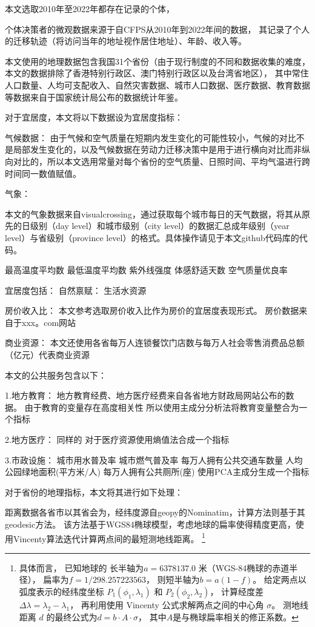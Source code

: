 \documentclass[
  a4paper,
  zihao=-4,
  fontset=mac,
  AutoFakeBold,
  AutoFakeSlant,
  oneside]{ctexbook}
\let\oldfootnote\footnote
\renewcommand{\footnote}[1]{%
  \oldfootnote{\setstretch{1.5}#1}%
}
\begin{document}
本文选取2010年至2022年都存在记录的个体，

个体决策者的微观数据来源于自CFPS从2010年到2022年间的数据，
其记录了个人的迁移轨迹（将访问当年的地址视作居住地址）、年龄、收入等。


本文使用的地理数据包含我国31个省份（由于现行制度的不同和数据收集的难度，本文的数据排除了香港特别行政区、澳门特别行政区以及台湾省地区），
其中常住人口数量、人均可支配收入、自然灾害数据、城市人口数据、医疗数据、教育数据等数据来自于国家统计局公布的数据统计年鉴。


对于宜居度，本文将以下数据设为宜居度指标：

气候数据：
由于气候和空气质量在短期内发生变化的可能性较小，气候的对比不是局部发生变化的，以及气候数据在劳动力迁移决策中是用于进行横向对比而非纵向对比的，所以本文选用常量对每个省份的空气质量、日照时间、平均气温进行跨时间同一数值赋值。

气象：

本文的气象数据来自visualcrossing，通过获取每个城市每日的天气数据，将其从原先的日级别（day level）和城市级别（city level）的数据汇总成年级别（year level）与省级别（province level）的格式。具体操作请见于本文github代码库的代码。

最高温度平均数 最低温度平均数 紫外线强度 体感舒适天数  空气质量优良率


宜居度包括：
自然禀赋：
生活水资源


房价收入比：
本文参考\textcite{LiHuiFangJieFangJieShouRuBiYuLiuDongRenKouChangQiJuLiuYiYuanLaiZiLiuDongRenKouDeWeiGuanZhengJu2019}选取房价收入比作为房价的宜居度表现形式。
房价数据来自于xxx。com网站

商业资源：
本文还使用各省每万人连锁餐饮门店数与每万人社会零售消费品总额（亿元）代表商业资源


本文的公共服务包含以下：

1.地方教育：
地方教育经费、地方医疗经费来自各省地方财政局网站公布的数据。
由于教育的变量存在高度相关性
所以使用主成分分析法将教育变量整合为一个指标

2.地方医疗：
同样的
对于医疗资源使用熵值法合成一个指标

3.市政设施：
城市用水普及率
城市燃气普及率
每万人拥有公共交通车数量
人均公园绿地面积(平方米/人)
每万人拥有公共厕所(座)
使用PCA主成分生成一个指标


对于省份的地理指标，本文将其进行如下处理：

距离数据各省市以其省会为，经纬度源自geopy的Nominatim，计算方法则基于其geodesic方法。
该方法基于WGS84椭球模型，考虑地球的扁率使得精度更高，使用Vincenty算法迭代计算两点间的最短测地线距离。
\footnote{
具体而言，
已知地球的
长半轴为$a = 6378137.0$ 米（WGS-84椭球的赤道半径），
扁率为$f = 1 / 298.257223563$，
则短半轴为$b = a(1 - f)$。
给定两点以弧度表示的经纬度坐标 $ P_1(\phi_1, \lambda_1) $ 和 $ P_2(\phi_2, \lambda_2) $，
计算经度差$\Delta\lambda = \lambda_2 - \lambda_1$，
再利用使用 Vincenty 公式求解两点之间的中心角 $\sigma$。
测地线距离 $d$ 的最终公式为$d = b \cdot A \cdot \sigma$，
其中$A$是与椭球扁率相关的修正系数。
}
\end{document}
